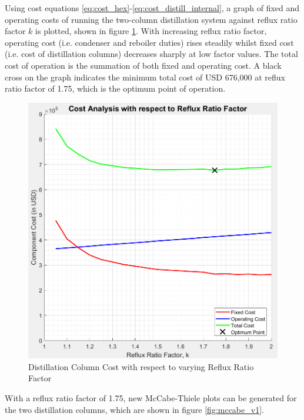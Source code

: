 \documentclass[11pt,oneside]{article}
\begin{document}
    \noindent Using cost equations \ref{eq:cost_hex}-\ref{eq:cost_distill_internal}, a graph of fixed and operating costs of running the two-column distillation system against reflux ratio factor $k$ is plotted, shown in figure \ref{fig:column_cost_vs_reflux}.
    With increasing reflux ratio factor, operating cost (i.e. condenser and reboiler duties) rises steadily whilst fixed cost (i.e. cost of distillation columns) decreases sharply at low factor values. The total cost of operation is the summation of both fixed and operating cost. A black cross on the graph indicates the minimum total cost of USD 676,000 at reflux ratio factor of 1.75, which is the optimum point of operation. \\
    \begin{figure}[H]
        \centering
        \includegraphics[scale=0.45]{column_cost_vs_reflux.jpeg}
        \caption{Distillation Column Cost with respect to varying Reflux Ratio Factor}
        \label{fig:column_cost_vs_reflux}
    \end{figure}
    \noindent With a reflux ratio factor of 1.75, new McCabe-Thiele plots can be generated for the two distillation columns, which are shown in figure \ref{fig:mccabe_v1}.
\end{document}
